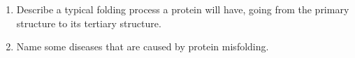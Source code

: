 \begin{enumerate}

\item Describe a typical folding process a protein will have, going from the primary structure to its tertiary structure.


\item Name some diseases that are caused by protein misfolding.


\end{enumerate}
